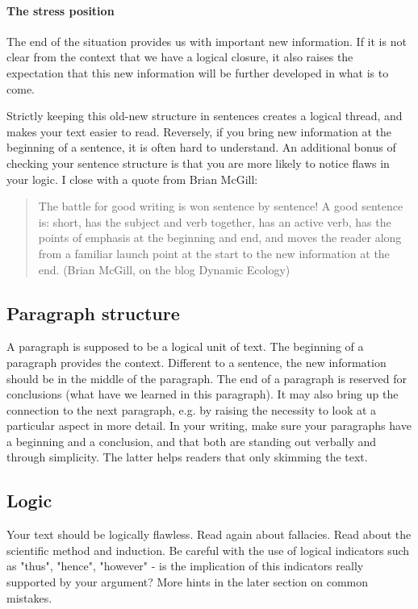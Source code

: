 \documentclass{tufte-book}
\begin{document}
\paragraph{The stress position} The end of the situation provides us with important new information. If it is not clear from the context that we have a logical closure, it also raises the expectation that this new information will be further developed in what is to come. 

Strictly keeping this old-new structure in sentences creates a logical thread, and makes your text easier to read. Reversely, if you bring new information at the beginning of a sentence, it is often hard to understand. An additional bonus of checking your sentence structure is that you are more likely to notice flaws in your logic. I close with a quote from Brian McGill:


\begin{quote}
The battle for good writing is won sentence by sentence! A good sentence is: short, has the subject and verb together, has an active verb, has the points of emphasis at the beginning and end, and moves the reader along from a familiar launch point at the start to the new information at the end. (Brian McGill, on the blog Dynamic Ecology)
\end{quote}


\subsection{Paragraph structure}

A paragraph is supposed to be a logical unit of text. The beginning of a paragraph provides the context. Different to a sentence, the new information should be in the middle of the paragraph. The end of a paragraph is reserved for conclusions (what have we learned in this paragraph). It may also bring up the connection to the next paragraph, e.g. by raising the necessity to look at a particular aspect in more detail. In your writing, make sure your paragraphs have a beginning and a conclusion, and that both are standing out verbally and through simplicity. The latter helps readers that only skimming the text. 

\subsection{Logic}

Your text should be logically flawless. Read again about fallacies. Read about the scientific method and induction. Be careful with the use of logical indicators such as "thus", "hence", "however" - is the implication of this indicators really supported by your argument? More hints in the later section on common mistakes.
\end{document}
